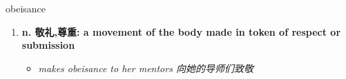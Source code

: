 
\begin{frame}
{\huge obeisance}
\begin{center}
\begin{enumerate}\Large
  \item \textbf{n. 敬礼,尊重: a movement of the body made in token of respect or submission}
  \begin{itemize}
    \item \em{\Large{makes obeisance to her mentors 向她的导师们致敬}}
  \end{itemize}
\end{enumerate}
\end{center}
\end{frame}
